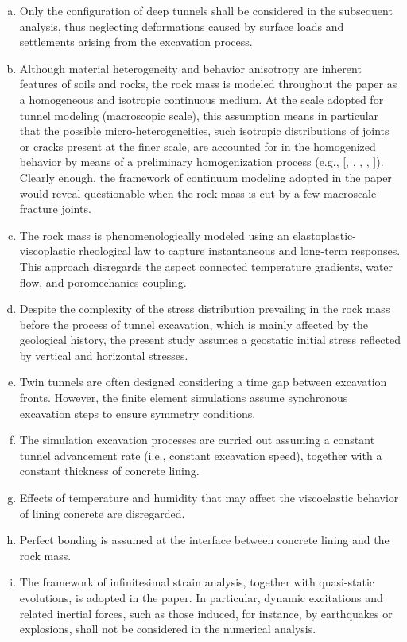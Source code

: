 \documentclass[a4paper,fleqn]{cas-sc}
\begin{document}
\begin{enumerate}[(a)]
	\item Only the configuration of deep tunnels shall be considered in the subsequent analysis, thus neglecting deformations caused by surface loads and settlements arising from the excavation process.

	\item Although material heterogeneity and behavior anisotropy are inherent features of soils and rocks, the rock mass is modeled throughout the paper as a homogeneous and isotropic continuous medium. At the scale adopted for tunnel modeling (macroscopic scale), this assumption means in particular that the possible micro-heterogeneities, such isotropic distributions of joints or cracks present at the finer scale, are accounted for in the homogenized behavior by means of a preliminary homogenization process (e.g., [, , , , ]). Clearly enough, the framework of continuum modeling adopted in the paper would reveal questionable when the rock mass is cut by a few macroscale fracture joints.  
	
	\item The rock mass is phenomenologically modeled using an elastoplastic-viscoplastic rheological law to capture instantaneous and long-term responses. This approach disregards the aspect connected temperature gradients, water flow, and poromechanics coupling.

	\item Despite the complexity of the stress distribution prevailing in the rock mass before the process of tunnel excavation, which is mainly affected by the geological history, the present study assumes a geostatic initial stress reflected by vertical and horizontal stresses.

	\item Twin tunnels are often designed considering a time gap between excavation fronts. However, the finite element simulations assume synchronous excavation steps to ensure symmetry conditions.

	\item The simulation excavation processes are curried out assuming a constant tunnel advancement rate (i.e., constant excavation speed), together with a constant thickness of concrete lining.
	
	\item Effects of temperature and humidity that may affect the viscoelastic behavior of lining concrete are disregarded.
	
	\item Perfect bonding is assumed at the interface between concrete lining and the rock mass.

	\item The framework of infinitesimal strain analysis, together with quasi-static evolutions, is adopted in the paper. In particular, dynamic excitations and related inertial forces, such as those induced, for instance, by earthquakes or explosions, shall not be considered in the numerical analysis.
	
\end{enumerate}
\end{document}
